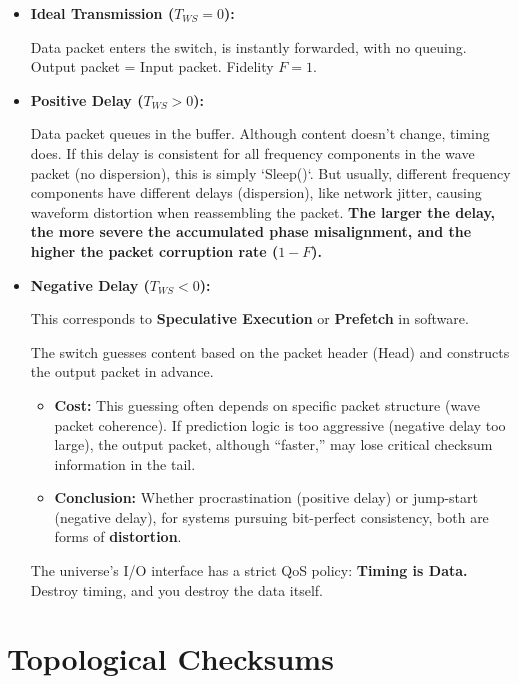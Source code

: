 \documentclass[11pt,a4paper,twoside]{book}
\begin{document}
\begin{itemize}
\item \textbf{Ideal Transmission ($T_{WS} = 0$):}

    Data packet enters the switch, is instantly forwarded, with no queuing. Output packet = Input packet. Fidelity $F=1$.

\item \textbf{Positive Delay ($T_{WS} > 0$):}

    Data packet queues in the buffer. Although content doesn't change, timing does. If this delay is consistent for all frequency components in the wave packet (no dispersion), this is simply `Sleep()`. But usually, different frequency components have different delays (dispersion), like network jitter, causing waveform distortion when reassembling the packet. \textbf{The larger the delay, the more severe the accumulated phase misalignment, and the higher the packet corruption rate ($1-F$).}

\item \textbf{Negative Delay ($T_{WS} < 0$):}

    This corresponds to \textbf{Speculative Execution} or \textbf{Prefetch} in software.

    The switch guesses content based on the packet header (Head) and constructs the output packet in advance.

    \begin{itemize}
    \item \textbf{Cost:} This guessing often depends on specific packet structure (wave packet coherence). If prediction logic is too aggressive (negative delay too large), the output packet, although ``faster,'' may lose critical checksum information in the tail.

    \item \textbf{Conclusion:} Whether procrastination (positive delay) or jump-start (negative delay), for systems pursuing bit-perfect consistency, both are forms of \textbf{distortion}.
    \end{itemize}

    The universe's I/O interface has a strict QoS policy: \textbf{Timing is Data.} Destroy timing, and you destroy the data itself.
\end{itemize}

 \section{Topological Checksums}
\end{document}
